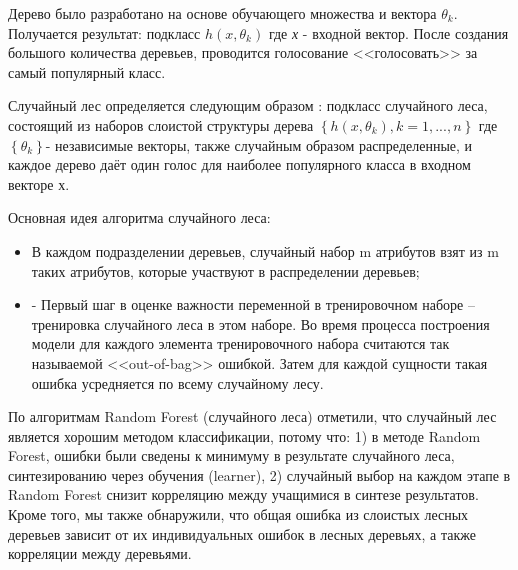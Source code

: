 Дерево было разработано на основе обучающего множества и вектора $\theta_k$. Получается результат: подкласс $h\left(x, \theta_k \right)$ где \textit{х} - входной вектор. После создания большого количества деревьев, проводится голосование <<голосовать>> за самый популярный класс.

Случайный лес определяется следующим образом \cite{Biggio2011}: подкласс случайного леса, состоящий из наборов слоистой структуры дерева $\left\{h\left(x,\theta_k\right), k=1, ...,n\right\}$ где $\left\{\theta_k\right\}$- независимые векторы, также случайным образом распределенные, и каждое дерево даёт один голос для наиболее популярного класса в входном векторе $х$.

Основная идея алгоритма случайного леса:

\begin{itemize}
	\item В каждом подразделении деревьев, случайный набор m атрибутов взят из m таких атрибутов, которые участвуют в распределении деревьев;
	\item -	Первый шаг в оценке важности переменной в тренировочном наборе – тренировка случайного леса в этом наборе. Во время процесса построения модели для каждого элемента тренировочного набора считаются так называемой <<out-of-bag>> ошибкой. Затем для каждой сущности такая ошибка усредняется по всему случайному лесу.
\end{itemize}

По алгоритмам Random Forest (случайного леса) отметили, что случайный лес является хорошим методом классификации, потому что: 1) в методе Random Forest, ошибки были сведены к минимуму в результате случайного леса, синтезированию через обучения (learner), 2) случайный выбор на каждом этапе в Random Forest снизит корреляцию между учащимися в синтезе результатов. Кроме того, мы также обнаружили, что общая ошибка из слоистых лесных деревьев зависит от их индивидуальных ошибок в лесных деревьях, а также корреляции между деревьями.